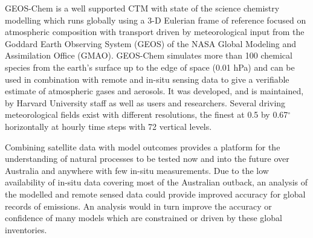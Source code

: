 GEOS-Chem is a well supported CTM with state of the science chemistry modelling which runs globally using a 3-D Eulerian frame of reference focused on atmospheric composition with transport driven by meteorological input from the Goddard Earth Observing System (GEOS) of the NASA Global Modeling and Assimilation Office (GMAO).
GEOS-Chem simulates more than 100 chemical species from the earth's surface up to the edge of space (0.01 hPa) and can be used in combination with remote and in-situ sensing data to give a verifiable estimate of atmospheric gases and aerosols.
It was developed, and is maintained, by Harvard University staff as well as users and researchers. 
Several driving meteorological fields exist with different resolutions, the finest at 0.5 by 0.67$^\circ$ horizontally at hourly time steps with 72 vertical levels.

Combining satellite data with model outcomes provides a platform for the understanding of natural processes to be tested now and into the future over Australia and anywhere with few in-situ measurements.
Due to the low availability of in-situ data covering most of the Australian outback, an analysis of the modelled and remote sensed data could provide improved accuracy for global records of emissions.
An analysis would in turn improve the accuracy or confidence of many models which are constrained or driven by these global inventories.
